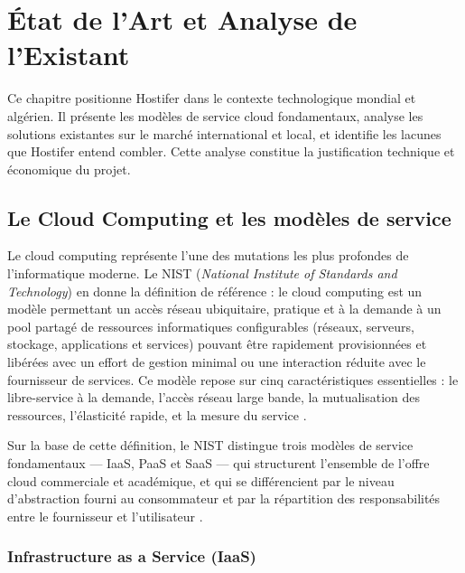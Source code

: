 \chapter{État de l'Art et Analyse de l'Existant}

Ce chapitre positionne Hostifer dans le contexte technologique mondial et algérien. Il présente les modèles de service cloud fondamentaux, analyse les solutions existantes sur le marché international et local, et identifie les lacunes que Hostifer entend combler. Cette analyse constitue la justification technique et économique du projet.


\section{Le Cloud Computing et les modèles de service}

Le cloud computing représente l'une des mutations les plus profondes de l'informatique moderne. Le NIST (\textit{National Institute of Standards and Technology}) en donne la définition de référence : le cloud computing est un modèle permettant un accès réseau ubiquitaire, pratique et à la demande à un pool partagé de ressources informatiques configurables (réseaux, serveurs, stockage, applications et services) pouvant être rapidement provisionnées et libérées avec un effort de gestion minimal ou une interaction réduite avec le fournisseur de services.  Ce modèle repose sur cinq caractéristiques essentielles : le libre-service à la demande, l'accès réseau large bande, la mutualisation des ressources, l'élasticité rapide, et la mesure du service \cite{nist-sp800-145}.

Sur la base de cette définition, le NIST distingue trois modèles de service fondamentaux — IaaS, PaaS et SaaS — qui structurent l'ensemble de l'offre cloud commerciale et académique, et qui se différencient par le niveau d'abstraction fourni au consommateur et par la répartition des responsabilités entre le fournisseur et l'utilisateur \cite{nist-sp800-292}.

\subsection*{Infrastructure as a Service (IaaS)}

